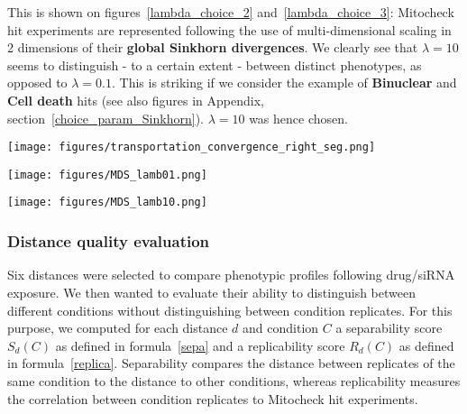 This is shown on figures~\ref{lambda_choice_2} and~\ref{lambda_choice_3}: Mitocheck hit experiments are represented following the use of multi-dimensional scaling in 2 dimensions of their \textbf{global Sinkhorn divergences}. We clearly see that $\lambda=10$ seems to distinguish - to a certain extent - between distinct phenotypes, as opposed to $\lambda=0.1$. This is striking if we consider the example of \textbf{Binuclear} and \textbf{Cell death} hits (see also figures in Appendix, section~\ref{choice_param_Sinkhorn}). $\lambda=10$ was hence chosen.

\begin{figure*}[ht!]
\centerline{\texttt{[image: figures/transportation\_convergence\_right\_seg.png]}
}
\caption{Convergence of Sinkhorn divergence as a function of lambda. Divergences were computed between drug screen experiments and Mitocheck hit experiments for different values of lambda, and the distribution of their relative variation to the divergences computed for $\lambda=30$ are showed here.}
\label{lambda_choice1}
\end{figure*}
\begin{figure*}[ht!]
\centerline{
\texttt{[image: figures/MDS\_lamb01.png]}
}
\caption{Separation between Mitocheck hit categories (left) for $\lambda=0.1$. Global Sinkhorn divergences between Mitocheck hit experiments were computed for $\lambda=0.1$, and multi-dimensional scaling was used for representing them in two dimensions in the first two lines. Divergences between these experiments and the drug screen were included and their multi-dimension scaling is shown on the right plot.}
\label{lambda_choice_2}
\end{figure*}
\begin{figure*}[ht!]
\centerline{
\texttt{[image: figures/MDS\_lamb10.png]}}
\caption{Separation between Mitocheck hit categories (left) for $\lambda=10$. Global Sinkhorn divergences between Mitocheck hit experiments were computed for $\lambda=10$, and multi-dimensional scaling was used for representing them in two dimensions in the first two lines. Divergences between these experiments and the drug screen were included and their multi-dimension scaling is shown on the right plot.}
\label{lambda_choice_3}
\end{figure*}

\subsubsection{Distance quality evaluation}
Six distances were selected to compare phenotypic profiles following drug/siRNA exposure. We then wanted to evaluate their ability to distinguish between different conditions without distinguishing between condition replicates. For this purpose, we computed for each distance $d$ and condition $C$ a separability score $S_d(C)$ as defined in formula~\ref{sepa} and a replicability score $R_d(C)$ as defined in formula~\ref{replica}. Separability compares the distance between replicates of the same condition to the distance to other conditions, whereas replicability measures the correlation between condition replicates to Mitocheck hit experiments.

